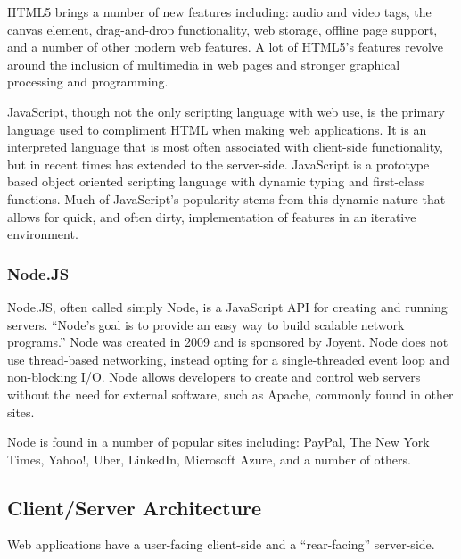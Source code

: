 \documentclass[11pt]{article}
\begin{document}
HTML5 brings a number of new features including: audio and video tags, the canvas element, drag-and-drop functionality, web storage, offline page support, and a number of other modern web features. A lot of HTML5's features revolve around the inclusion of multimedia in web pages and stronger graphical processing and programming.



JavaScript, though not the only scripting language with web use, is the primary language used to compliment HTML when making web applications. It is an interpreted language that is most often associated with client-side functionality, but in recent times has extended to the server-side. JavaScript is a prototype based object oriented scripting language with dynamic typing and first-class functions. Much of JavaScript's popularity stems from this dynamic nature that allows for quick, and often dirty, implementation of features in an iterative environment.


\subsubsection{Node.JS}
Node.JS, often called simply Node, is a JavaScript API for creating and running servers. ``Node's goal is to provide an easy way to build scalable network programs.'' \cite{Node} Node was created in 2009 and is sponsored by Joyent. Node does not use thread-based networking, instead opting for a single-threaded event loop and non-blocking I/O. Node allows developers to create and control web servers without the need for external software, such as Apache, commonly found in other sites.

Node is found in a number of popular sites including: PayPal, The New York Times, Yahoo!, Uber, LinkedIn, Microsoft Azure, and a number of others. \cite{Node}


\subsection{Client/Server Architecture}
Web applications have a user-facing client-side and a ``rear-facing''  server-side.
\end{document}
